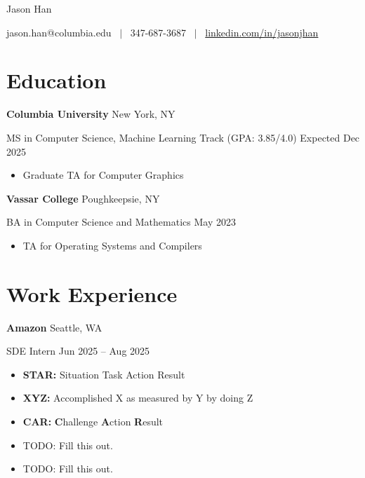 \documentclass[11pt]{article}
\newcommand{\resumeentry}[4]{%
\textbf{#1} \hfill {\small #2}
\par
{\small #3} \hfill {\small #4}}
\begin{document}
{\centering%
{\huge Jason Han \par}
\medskip
{jason.han@columbia.edu ~$\vert$~ {\small 347-687-3687} ~$\vert$~ \href{https://www.linkedin.com/in/jasonjhan/}{linkedin.com/in/jasonjhan} \par}}

\section{Education}
\resumeentry{Columbia University}{New York, NY}{MS in Computer Science, Machine Learning Track (GPA: 3.85/4.0)}{Expected Dec 2025}
\begin{itemize}
  \item {\small Graduate TA for Computer Graphics}
\end{itemize}

\smallskip

\resumeentry{Vassar College}{Poughkeepsie, NY}{BA in Computer Science and Mathematics}{May 2023}
\begin{itemize}
  \item {\small TA for Operating Systems and Compilers}
\end{itemize}

\section{Work Experience}
\resumeentry{Amazon}{Seattle, WA}{SDE Intern}{Jun 2025 -- Aug 2025}
\begin{itemize}
  \item \textbf{STAR:} Situation Task Action Result
  \item \textbf{XYZ:} Accomplished X as measured by Y by doing Z
  \item \textbf{CAR:} \textbf{C}hallenge \textbf{A}ction \textbf{R}esult
  \item TODO: Fill this out.
  \item TODO: Fill this out.
\end{itemize}

\smallskip
\end{document}
